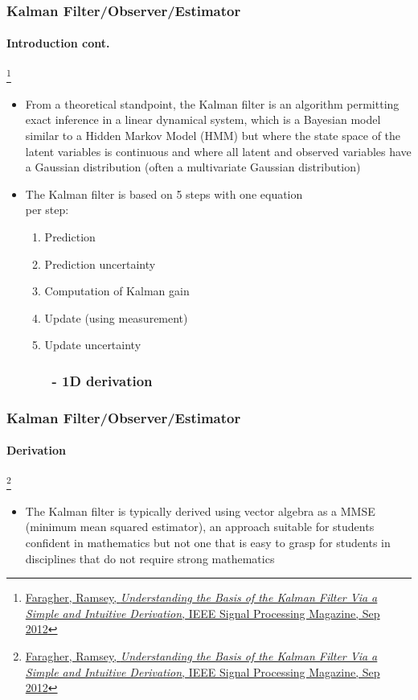 \begin{frame}
\frametitle{Kalman Filter/Observer/Estimator}
\framesubtitle{Introduction \tiny cont.}

\footnote{\tiny\hspace{-0.23in} \href{http://www.cl.cam.ac.uk/~rmf25/papers/Understanding the Basis of the Kalman Filter.pdf}{Faragher, Ramsey, \emph{Understanding the Basis of the Kalman Filter Via a Simple and Intuitive Derivation}, IEEE Signal Processing Magazine, Sep 2012}}
\scriptsize
\begin{itemize}
\item From a theoretical standpoint, the Kalman filter is an algorithm permitting exact inference in a linear dynamical system, which is a Bayesian model similar to a Hidden Markov Model (HMM) but where the state space of the latent variables is continuous and where all latent and observed variables have a Gaussian distribution (often a multivariate Gaussian distribution)
\item The Kalman filter is based on 5 steps with one equation \\per step:
\begin{enumerate}\scriptsize 
\item {\color{red}Prediction}
\item {\color{red}Prediction uncertainty}
\item Computation of {\color{orange}Kalman gain}
\item {\color{darkgreen}Update} (using {\color{blue}measurement})
\item {\color{darkgreen}Update uncertainty}
\end{enumerate}\scriptsize 
\end{itemize}
\end{frame}

\subsubsection{\ \ \ \ \ \ - 1D derivation}
\begin{frame}
\frametitle{Kalman Filter/Observer/Estimator}
\framesubtitle{Derivation}

\footnote{\tiny\hspace{-0.23in} \href{http://www.cl.cam.ac.uk/~rmf25/papers/Understanding the Basis of the Kalman Filter.pdf}{Faragher, Ramsey, \emph{Understanding the Basis of the Kalman Filter Via a Simple and Intuitive Derivation}, IEEE Signal Processing Magazine, Sep 2012}}
\scriptsize
\begin{itemize}
\item The Kalman filter is typically derived using vector algebra as a MMSE (minimum mean squared estimator), an approach suitable for students confident in mathematics but not one that is easy to grasp for students in disciplines that do not require strong mathematics
\end{itemize}
\end{frame}


